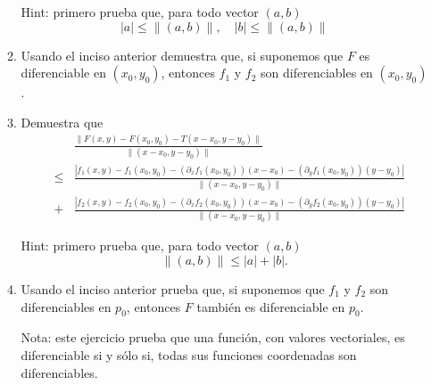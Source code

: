 \documentclass{article}
\theoremstyle{definition}
\begin{document}
\begin{enumerate}
\begin{enumerate}
            Hint: primero prueba  que, para todo vector $(a,b)$
            $$
            |a|\leq \| (a,b)\|, \quad |b|\leq \|(a,b) \|
            $$
            
          \item Usando el inciso anterior demuestra que, si suponemos
            que $F$ es diferenciable en $(x_0,y_0)$, entonces
            $f_1$ y $f_2$ son diferenciables en $(x_0,y_0)$.

          \item Demuestra que
            \begin{eqnarray*}
              & & \frac{\|F(x,y)-F(x_0,y_0)-T(x-x_0,y-y_0) \|}{\|(x-x_0,y-y_0)\|} \\
              &\leq &
                      \frac{|f_1(x,y)-f_1(x_0,y_0)-
                      (\partial_xf_1(x_0,y_0))(x-x_0)-
                      (\partial_yf_1(x_0,y_0))(y-y_0)|}
                      {\| (x-x_0,y-y_0)\|} \\
              &+&  \frac{|f_2(x,y)-f_2(x_0,y_0)-
                      (\partial_xf_2(x_0,y_0))(x-x_0)-
                      (\partial_yf_2(x_0,y_0))(y-y_0)|}
                      {\| (x-x_0,y-y_0)\|}
            \end{eqnarray*}

            Hint: primero prueba que, para todo vector $(a,b)$
            $$
            \| (a,b) \| \leq |a| + |b|.
            $$

            \item Usando el inciso anterior prueba que, si
          suponemos que $f_1$ y $f_2$ son diferenciables
          en $p_0$, entonces $F$ tambi\'en es diferenciable
          en $p_0$.


          Nota: este ejercicio prueba que una funci\'on,
          con valores vectoriales, es diferenciable si y s\'olo si,
          todas sus funciones coordenadas son diferenciables.
         
          \end{enumerate}

        
\end{enumerate}


  
       
\end{document}
